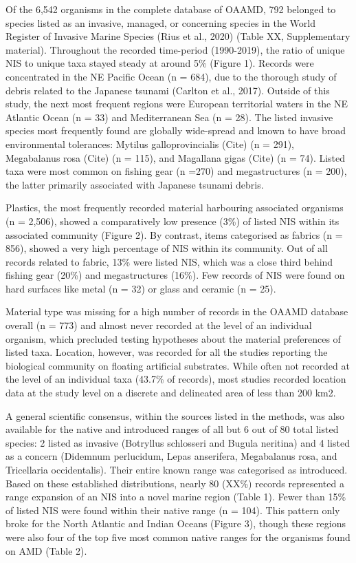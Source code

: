 \documentclass[a4paper, nobind]{templates/ociamthesis}
\begin{document}
Of the 6,542 organisms in the complete database of OAAMD, 792 belonged to species listed as an invasive, managed, or concerning species in the World Register of Invasive Marine Species (Rius et al., 2020) (Table XX, Supplementary material). Throughout the recorded time-period (1990-2019), the ratio of unique NIS to unique taxa stayed steady at around 5\% (Figure 1). Records were concentrated in the NE Pacific Ocean (n = 684), due to the thorough study of debris related to the Japanese tsunami (Carlton et al., 2017). Outside of this study, the next most frequent regions were European territorial waters in the NE Atlantic Ocean (n = 33) and Mediterranean Sea (n = 28). The listed invasive species most frequently found are globally wide-spread and known to have broad environmental tolerances: Mytilus galloprovincialis (Cite) (n = 291), Megabalanus rosa (Cite) (n = 115), and Magallana gigas (Cite) (n = 74). Listed taxa were most common on fishing gear (n =270) and megastructures (n = 200), the latter primarily associated with Japanese tsunami debris.

Plastics, the most frequently recorded material harbouring associated organisms (n = 2,506), showed a comparatively low presence (3\%) of listed NIS within its associated community (Figure 2). By contrast, items categorised as fabrics (n = 856), showed a very high percentage of NIS within its community. Out of all records related to fabric, 13\% were listed NIS, which was a close third behind fishing gear (20\%) and megastructures (16\%). Few records of NIS were found on hard surfaces like metal (n = 32) or glass and ceramic (n = 25).

Material type was missing for a high number of records in the OAAMD database overall (n = 773) and almost never recorded at the level of an individual organism, which precluded testing hypotheses about the material preferences of listed taxa. Location, however, was recorded for all the studies reporting the biological community on floating artificial substrates. While often not recorded at the level of an individual taxa (43.7\% of records), most studies recorded location data at the study level on a discrete and delineated area of less than 200 km2.

A general scientific consensus, within the sources listed in the methods, was also available for the native and introduced ranges of all but 6 out of 80 total listed species: 2 listed as invasive (Botryllus schlosseri and Bugula neritina) and 4 listed as a concern (Didemnum perlucidum, Lepas anserifera, Megabalanus rosa, and Tricellaria occidentalis). Their entire known range was categorised as introduced. Based on these established distributions, nearly 80 (XX\%) records represented a range expansion of an NIS into a novel marine region (Table 1). Fewer than 15\% of listed NIS were found within their native range (n = 104). This pattern only broke for the North Atlantic and Indian Oceans (Figure 3), though these regions were also four of the top five most common native ranges for the organisms found on AMD (Table 2).
\end{document}

